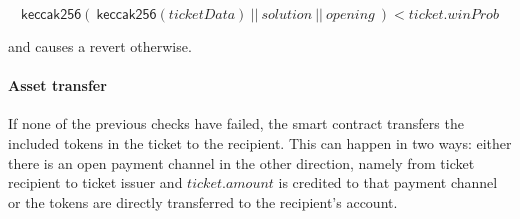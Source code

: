 $$ \mathsf{keccak256} ( \ \mathsf{keccak256}(ticketData) \ || \ solution \ || \ opening \ ) < ticket.winProb $$

and causes a revert otherwise.

\paragraph{Asset transfer}
\label{sec:tickets:redemption:assettransfer}

If none of the previous checks have failed, the smart contract transfers the included tokens in the ticket to the recipient. This can happen in two ways: either there is an open payment channel in the other direction, namely from ticket recipient to ticket issuer and $ticket.amount$ is credited to that payment channel or the tokens are directly transferred to the recipient's account.
